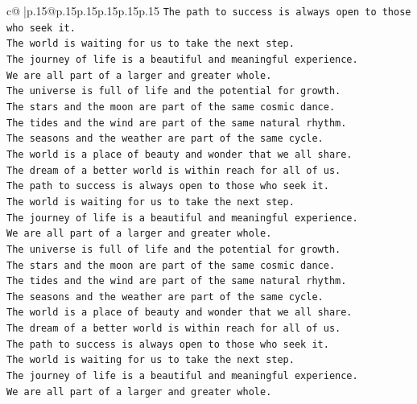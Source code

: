 \documentclass{article}
\begin{document}
{\begin{supertabular}{c@{$\;$}|p{.15\linewidth}@{}p{.15\linewidth}p{.15\linewidth}p{.15\linewidth}p{.15\linewidth}p{.15\linewidth}}
{{{\texttt{The path to success is always open to those who seek it.} \\
\texttt{The world is waiting for us to take the next step.} \\
\texttt{The journey of life is a beautiful and meaningful experience.} \\
\texttt{We are all part of a larger and greater whole.} \\
\texttt{The universe is full of life and the potential for growth.} \\
\texttt{The stars and the moon are part of the same cosmic dance.} \\
\texttt{The tides and the wind are part of the same natural rhythm.} \\
\texttt{The seasons and the weather are part of the same cycle.} \\
\texttt{The world is a place of beauty and wonder that we all share.} \\
\texttt{The dream of a better world is within reach for all of us.} \\
\texttt{The path to success is always open to those who seek it.} \\
\texttt{The world is waiting for us to take the next step.} \\
\texttt{The journey of life is a beautiful and meaningful experience.} \\
\texttt{We are all part of a larger and greater whole.} \\
\texttt{The universe is full of life and the potential for growth.} \\
\texttt{The stars and the moon are part of the same cosmic dance.} \\
\texttt{The tides and the wind are part of the same natural rhythm.} \\
\texttt{The seasons and the weather are part of the same cycle.} \\
\texttt{The world is a place of beauty and wonder that we all share.} \\
\texttt{The dream of a better world is within reach for all of us.} \\
\texttt{The path to success is always open to those who seek it.} \\
\texttt{The world is waiting for us to take the next step.} \\
\texttt{The journey of life is a beautiful and meaningful experience.} \\
\texttt{We are all part of a larger and greater whole.} \\
}}}
\end{supertabular}}
\end{document}
